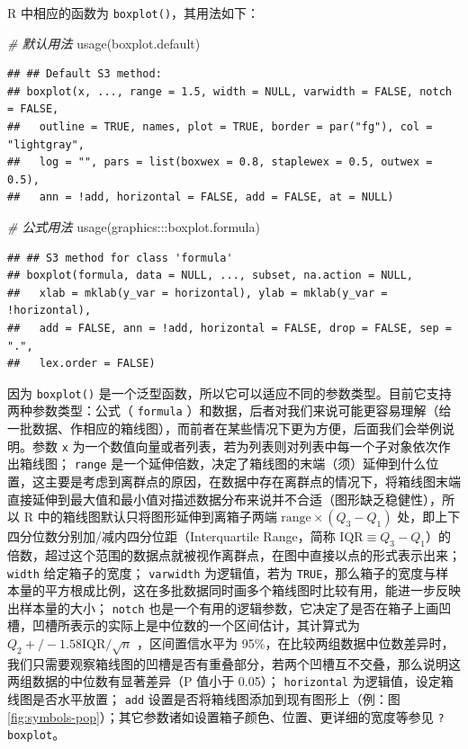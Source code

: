 \documentclass[
  b5paper,
  UTF8,twoside]{book}
\newenvironment{Shaded}{\begin{snugshade}}{\end{snugshade}}
\newcommand{\CommentTok}[1]{\textcolor[rgb]{0.56,0.35,0.01}{\textit{#1}}}
\newcommand{\FunctionTok}[1]{\textcolor[rgb]{0.00,0.00,0.00}{#1}}
\newcommand{\NormalTok}[1]{#1}
\newcommand{\SpecialCharTok}[1]{\textcolor[rgb]{0.00,0.00,0.00}{#1}}
\begin{document}
R 中相应的函数为 \texttt{boxplot()}，其用法如下：

\begin{Shaded}
\begin{Highlighting}[]
\CommentTok{\# 默认用法}
\FunctionTok{usage}\NormalTok{(boxplot.default)}
\end{Highlighting}
\end{Shaded}

\begin{verbatim}
## ## Default S3 method:
## boxplot(x, ..., range = 1.5, width = NULL, varwidth = FALSE, notch = FALSE,
##   outline = TRUE, names, plot = TRUE, border = par("fg"), col = "lightgray",
##   log = "", pars = list(boxwex = 0.8, staplewex = 0.5, outwex = 0.5),
##   ann = !add, horizontal = FALSE, add = FALSE, at = NULL)
\end{verbatim}

\begin{Shaded}
\begin{Highlighting}[]
\CommentTok{\# 公式用法}
\FunctionTok{usage}\NormalTok{(graphics}\SpecialCharTok{:::}\NormalTok{boxplot.formula)}
\end{Highlighting}
\end{Shaded}

\begin{verbatim}
## ## S3 method for class 'formula'
## boxplot(formula, data = NULL, ..., subset, na.action = NULL,
##   xlab = mklab(y_var = horizontal), ylab = mklab(y_var = !horizontal),
##   add = FALSE, ann = !add, horizontal = FALSE, drop = FALSE, sep = ".",
##   lex.order = FALSE)
\end{verbatim}

因为 \texttt{boxplot()} 是一个泛型函数，所以它可以适应不同的参数类型。目前它支持两种参数类型：公式（ \texttt{formula} ）和数据，后者对我们来说可能更容易理解（给一批数据、作相应的箱线图），而前者在某些情况下更为方便，后面我们会举例说明。参数 \texttt{x} 为一个数值向量或者列表，若为列表则对列表中每一个子对象依次作出箱线图； \texttt{range} 是一个延伸倍数，决定了箱线图的末端（须）延伸到什么位置，这主要是考虑到离群点的原因，在数据中存在离群点的情况下，将箱线图末端直接延伸到最大值和最小值对描述数据分布来说并不合适（图形缺乏稳健性），所以 R 中的箱线图默认只将图形延伸到离箱子两端 \(\mathrm{range}\times(Q_3-Q_1)\) 处，即上下四分位数分别加/减内四分位距（Interquartile
Range，简称 \(\text{IQR}\equiv Q_3-Q_1\)）的倍数，超过这个范围的数据点就被视作离群点，在图中直接以点的形式表示出来； \texttt{width} 给定箱子的宽度； \texttt{varwidth} 为逻辑值，若为 \texttt{TRUE}，那么箱子的宽度与样本量的平方根成比例，这在多批数据同时画多个箱线图时比较有用，能进一步反映出样本量的大小； \texttt{notch} 也是一个有用的逻辑参数，它决定了是否在箱子上画凹槽，凹槽所表示的实际上是中位数的一个区间估计，其计算式为 \(Q_2+/-1.58\mathrm{IQR}/\sqrt{n}\)
\citep{McGill78, Chambers83}，区间置信水平为 95\%，在比较两组数据中位数差异时，我们只需要观察箱线图的凹槽是否有重叠部分，若两个凹槽互不交叠，那么说明这两组数据的中位数有显著差异（P 值小于 0.05）； \texttt{horizontal} 为逻辑值，设定箱线图是否水平放置； \texttt{add} 设置是否将箱线图添加到现有图形上（例：图 \ref{fig:symbols-pop}）；其它参数诸如设置箱子颜色、位置、更详细的宽度等参见 \texttt{?boxplot}。
\end{document}
